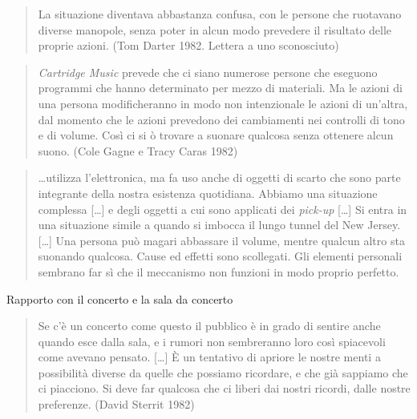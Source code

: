 \begin{multicols}{2}
\begin{quote}
	La situazione diventava abbastanza confusa, con le persone che ruotavano diverse manopole, senza poter in alcun modo prevedere il risultato delle proprie azioni. (Tom Darter 1982. Lettera a uno sconosciuto)
\end{quote}

\begin{quote}
	\emph{Cartridge Music} prevede che ci siano numerose persone che eseguono programmi che hanno determinato per mezzo di materiali. Ma le azioni di una persona modificheranno in modo non intenzionale le azioni di un'altra, dal momento che le azioni prevedono dei cambiamenti nei controlli di tono e di volume. Cos\`i ci si \`o trovare a suonare qualcosa senza ottenere alcun suono. (Cole Gagne e Tracy Caras 1982)
\end{quote}

\begin{quote}
	\ldots utilizza l'elettronica, ma fa uso anche di oggetti di scarto che sono parte integrante della nostra esistenza quotidiana. Abbiamo una situazione complessa [\ldots] e degli oggetti a cui sono applicati dei \emph{pick-up} [\ldots] Si entra in una situazione simile a quando si imbocca il lungo tunnel del New Jersey. [\ldots] Una persona può magari abbassare il volume, mentre qualcun altro sta suonando qualcosa. Cause ed effetti sono scollegati. Gli elementi personali sembrano far sì che il meccanismo non funzioni in modo proprio perfetto.
\end{quote}

Rapporto con il concerto e la sala da concerto

\begin{quote}
	Se c'è un concerto come questo il pubblico è in grado di sentire anche quando esce dalla sala, e i rumori non sembreranno loro così spiacevoli come avevano pensato. [\ldots] È un tentativo di apriore le nostre menti a possibilità diverse da quelle che possiamo ricordare, e che già sappiamo che ci piacciono. Si deve far qualcosa che ci liberi dai nostri ricordi, dalle nostre preferenze. (David Sterrit 1982)
\end{quote}


\end{multicols}
